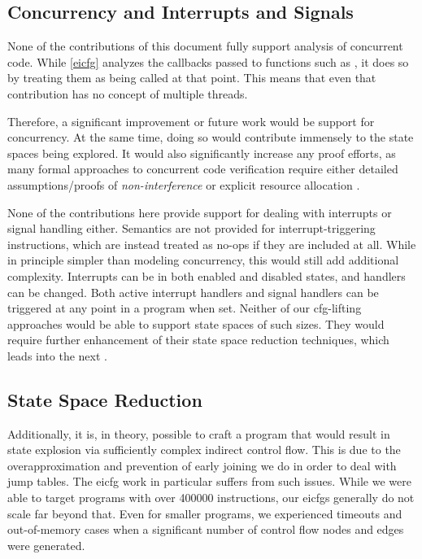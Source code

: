 \subsection{Concurrency and Interrupts and Signals}
None of the contributions of this document fully support analysis of concurrent code.
While \cref{eicfg} analyzes the callbacks passed to functions such as , it does so by treating them as being called at that point.
This means that even that contribution has no concept of multiple threads.

Therefore, a significant improvement or future work would be support for concurrency.
At the same time, doing so would contribute immensely to the state spaces being explored.
It would also significantly increase any proof efforts, as many formal approaches to concurrent code verification require either detailed assumptions/proofs of \emph{non-interference} \autocite{owicki1976gries} or explicit resource allocation \autocite{xu1997rely-guarantee}.

None of the contributions here provide support for dealing with interrupts or signal handling either.
Semantics are not provided for interrupt-triggering instructions, which are instead treated as no-ops if they are included at all.
While in principle simpler than modeling concurrency, this would still add additional complexity.
Interrupts can be in both enabled and disabled states, and handlers can be changed.
Both active interrupt handlers and signal handlers can be triggered at any point in a program when set.
Neither of our \ac{cfg}-lifting approaches would be able to support state spaces of such sizes.
They would require further enhancement of their state space reduction techniques, which leads into the next .

\subsection{State Space Reduction}\label{conclusion-state-space}
Additionally, it is, in theory, possible to craft a program that would result in state explosion via sufficiently complex indirect control flow.
This is due to the overapproximation and prevention of early joining we do in order to deal with jump tables.
The \ac{eicfg} work in particular suffers from such issues.
While we were able to target programs with over \num{400000} instructions, our \acp{eicfg} generally do not scale far beyond that.
Even for smaller programs, we experienced timeouts and out-of-memory cases when a significant number of control flow nodes and edges were generated.

